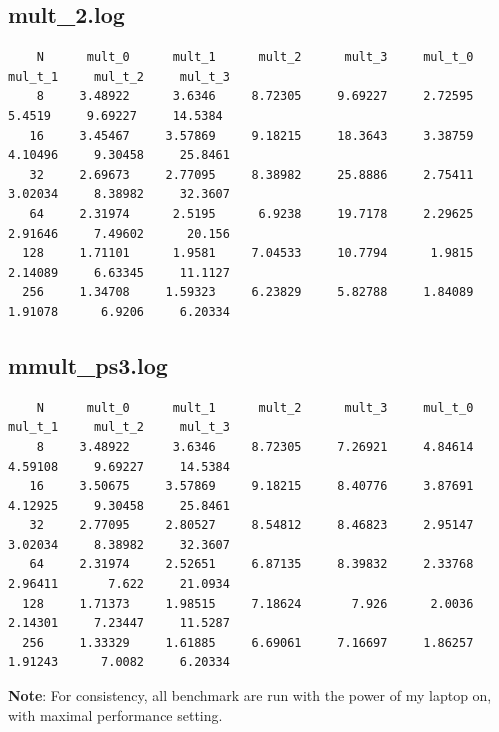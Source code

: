 \documentclass[]{article}
\begin{document}
    \subsection*{mult\_2.log}
        \begin{lstlisting}
    N      mult_0      mult_1      mult_2      mult_3     mul_t_0     mul_t_1     mul_t_2     mul_t_3
    8     3.48922      3.6346     8.72305     9.69227     2.72595      5.4519     9.69227     14.5384
   16     3.45467     3.57869     9.18215     18.3643     3.38759     4.10496     9.30458     25.8461
   32     2.69673     2.77095     8.38982     25.8886     2.75411     3.02034     8.38982     32.3607
   64     2.31974      2.5195      6.9238     19.7178     2.29625     2.91646     7.49602      20.156
  128     1.71101      1.9581     7.04533     10.7794      1.9815     2.14089     6.63345     11.1127
  256     1.34708     1.59323     6.23829     5.82788     1.84089     1.91078      6.9206     6.20334     
        \end{lstlisting}
    \subsection*{mmult\_ps3.log}
        \begin{lstlisting}
    N      mult_0      mult_1      mult_2      mult_3     mul_t_0     mul_t_1     mul_t_2     mul_t_3
    8     3.48922      3.6346     8.72305     7.26921     4.84614     4.59108     9.69227     14.5384
   16     3.50675     3.57869     9.18215     8.40776     3.87691     4.12925     9.30458     25.8461
   32     2.77095     2.80527     8.54812     8.46823     2.95147     3.02034     8.38982     32.3607
   64     2.31974     2.52651     6.87135     8.39832     2.33768     2.96411       7.622     21.0934
  128     1.71373     1.98515     7.18624       7.926      2.0036     2.14301     7.23447     11.5287
  256     1.33329     1.61885     6.69061     7.16697     1.86257     1.91243      7.0082     6.20334     
        \end{lstlisting}
    \textbf{Note}: For consistency, all benchmark are run with the power of my laptop on, with maximal performance setting. 
\end{document}
